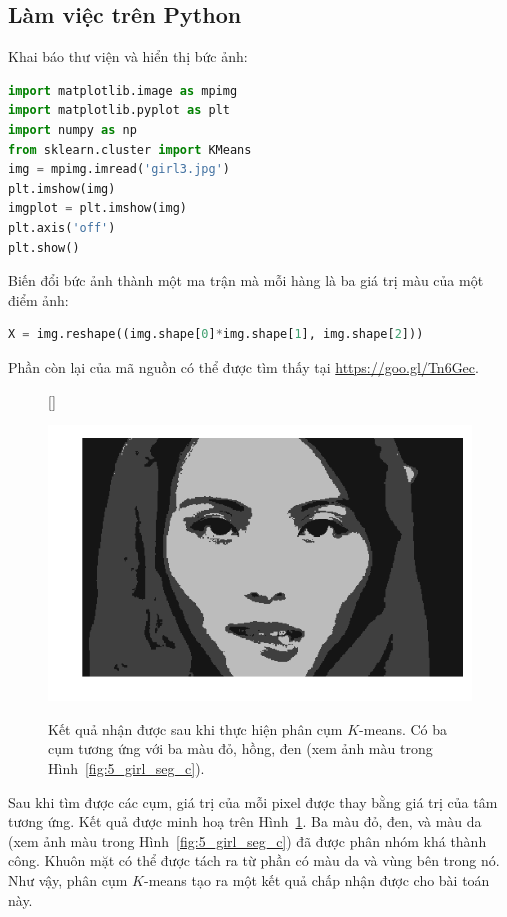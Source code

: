 \subsection{Làm việc trên Python}

{Khai báo thư viện và hiển thị bức ảnh:}

\begin{lstlisting}[language=Python]
import matplotlib.image as mpimg
import matplotlib.pyplot as plt
import numpy as np
from sklearn.cluster import KMeans
img = mpimg.imread('girl3.jpg')
plt.imshow(img)
imgplot = plt.imshow(img)
plt.axis('off')
plt.show()
\end{lstlisting}


{Biến đổi bức ảnh thành một ma trận mà mỗi hàng là ba giá trị màu của một điểm ảnh:}
\begin{lstlisting}[language=Python]
X = img.reshape((img.shape[0]*img.shape[1], img.shape[2]))
\end{lstlisting}

Phần còn lại của mã nguồn có thể được tìm thấy tại \url{https://goo.gl/Tn6Gec}.



\begin{figure}[t]
    [\FBwidth]
    {\caption{ 
    Kết quả nhận được sau khi thực hiện phân cụm $K$-means.
    Có ba cụm tương ứng với ba màu đỏ, hồng, đen (xem ảnh màu trong Hình~\ref{fig:5_girl_seg_c}). 
    }
    \label{fig:5_girl_seg}}
    { %
    \includegraphics[width=.5\textwidth]{Chapters/03_SimpleML/4_kmeans/girl_seg_gray.png}
    }
\end{figure}

Sau khi tìm được các cụm, giá trị của mỗi pixel được thay bằng giá trị của
tâm tương ứng. Kết quả được minh hoạ trên Hình~\ref{fig:5_girl_seg}. Ba màu
đỏ, đen, và màu da (xem ảnh màu trong Hình~\ref{fig:5_girl_seg_c}) đã được phân
nhóm khá thành công. Khuôn mặt có thể được tách ra từ phần có màu da và vùng
bên trong nó. Như vậy, phân cụm $K$-means tạo ra một kết quả chấp nhận được
cho bài toán này.


